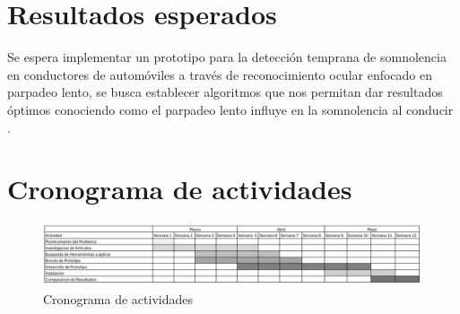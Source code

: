 \documentclass[letterpaper,12pt,oneside]{article}
\begin{document}
\section{Resultados esperados}
Se espera implementar un prototipo para la detección temprana de somnolencia en conductores de automóviles a través de reconocimiento ocular enfocado en parpadeo lento, se busca establecer algoritmos que nos permitan dar resultados óptimos conociendo como el parpadeo lento influye en la somnolencia al conducir .


\section{Cronograma de actividades} 


\begin{figure}[h]
    \centering
    \includegraphics[scale=.4]{cronogramaFV2.jpeg} %
    \caption{Cronograma de actividades}
    \label{fig:cron}
\end{figure}

\clearpage
\end{document}
